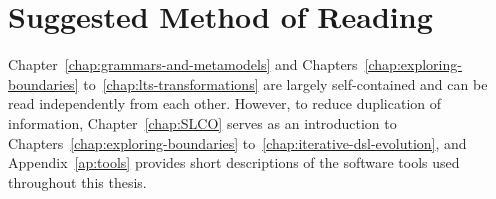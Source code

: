\section{Suggested Method of Reading}
\label{sec:introduction:method-of-reading}
Chapter~\ref{chap:grammars-and-metamodels} and Chapters~\ref{chap:exploring-boundaries} to~\ref{chap:lts-transformations} are largely self-contained and can be read independently from each other.
However, to reduce duplication of information, Chapter~\ref{chap:SLCO} serves as an introduction to Chapters~\ref{chap:exploring-boundaries} to~\ref{chap:iterative-dsl-evolution}, and Appendix~\ref{ap:tools} provides short descriptions of the software tools used throughout this thesis. 